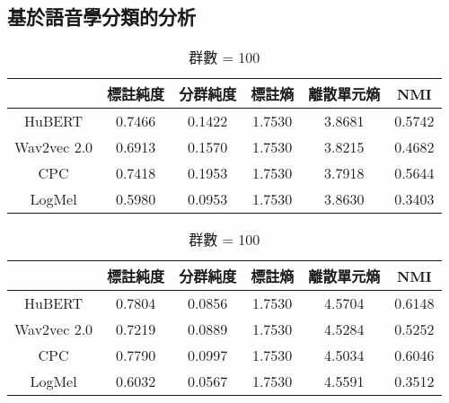\subsection{基於語音學分類的分析}
\begin{table}[!htbp]
    \centering
    \begin{subtable}[t]{\textwidth}
        \centering
        \begin{tabular}{|c|c|c|c|c|c|} \hline
                        & 標註純度   & 分群純度   & 標註熵    & 離散單元熵  & NMI    \\ \hline
            HuBERT      & 0.7466 & 0.1422 & 1.7530 & 3.8681 & 0.5742 \\ \hline    %
            Wav2vec 2.0 & 0.6913 & 0.1570 & 1.7530 & 3.8215 & 0.4682 \\ \hline    %
            CPC         & 0.7418 & 0.1953 & 1.7530 & 3.7918 & 0.5644 \\ \hline    %
            LogMel      & 0.5980 & 0.0953 & 1.7530 & 3.8630 & 0.3403 \\ \hline    %
        \end{tabular}
        \caption{群數 = 50}
        \label{tab:ch3-clu050-pcls}
    \end{subtable}

    \vspace{0.2cm}

    \begin{subtable}[t]{\textwidth}
        \centering
        \begin{tabular}{|c|c|c|c|c|c|} \hline
                        & 標註純度   & 分群純度   & 標註熵    & 離散單元熵  & NMI    \\ \hline
            HuBERT      & 0.7804 & 0.0856 & 1.7530 & 4.5704 & 0.6148 \\ \hline    %
            Wav2vec 2.0 & 0.7219 & 0.0889 & 1.7530 & 4.5284 & 0.5252 \\ \hline    %
            CPC         & 0.7790 & 0.0997 & 1.7530 & 4.5034 & 0.6046 \\ \hline    %
            LogMel      & 0.6032 & 0.0567 & 1.7530 & 4.5591 & 0.3512 \\ \hline    %
        \end{tabular}
        \caption{群數 = 100}
        \label{tab:ch3-clu100-pcls}
    \end{subtable}

    \vspace{0.2cm}


\end{table}
